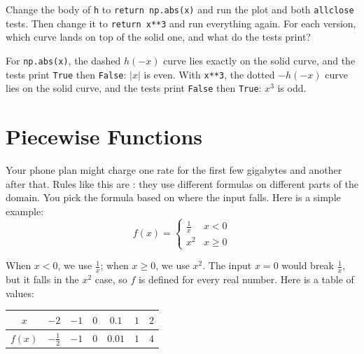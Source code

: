 \begin{Exercise}[title={Swap the function}, label={ex:functions-python-5}]
  Change the body of \texttt{h} to
  \texttt{return np.abs(x)} and run the plot and both
  \texttt{allclose} tests. Then change it to
  \texttt{return x**3} and run everything again. For each
  version, which curve lands on top of the solid one, and what do the tests
  print?
\end{Exercise}
\begin{Answer}[ref={ex:functions-python-5}]
  For \texttt{np.abs(x)}, the dashed $h(-x)$ curve lies exactly
  on the solid curve, and the tests print \texttt{True} then
  \texttt{False}: $|x|$ is even. With
  \texttt{x**3}, the dotted $-h(-x)$ curve lies on the solid
  curve, and the tests print \texttt{False} then
  \texttt{True}: $x^3$ is odd.
\end{Answer}


\section{Piecewise Functions}
Your phone plan might charge one rate for the first few gigabytes and
another after that. Rules like this are : they use different formulas on
different parts of the domain. You pick the formula based on where the input
falls. Here is a simple example:
\begin{equation*}
  f(x) = \begin{cases}
    \frac{1}{x} & x < 0   \\
    x^2         & x \ge 0
  \end{cases}
\end{equation*}

When $x<0$, we use $\frac{1}{x}$; when $x\ge0$, we use $x^2$. The input
$x=0$ would break $\frac{1}{x}$, but it falls in the $x^2$ case, so $f$ is
defined for every real number. Here is a table of values:

\begin{tabular}{|c|c|c|c|c|c|c|}\hline
  $x$    & $-2$            & $-1$ & $0$ & $0.1$  & $1$ & $2$ \\
  \hline
  $f(x)$ & $-\tfrac{1}{2}$ & $-1$ & $0$ & $0.01$ & $1$ & $4$ \\
  \hline
\end{tabular}

